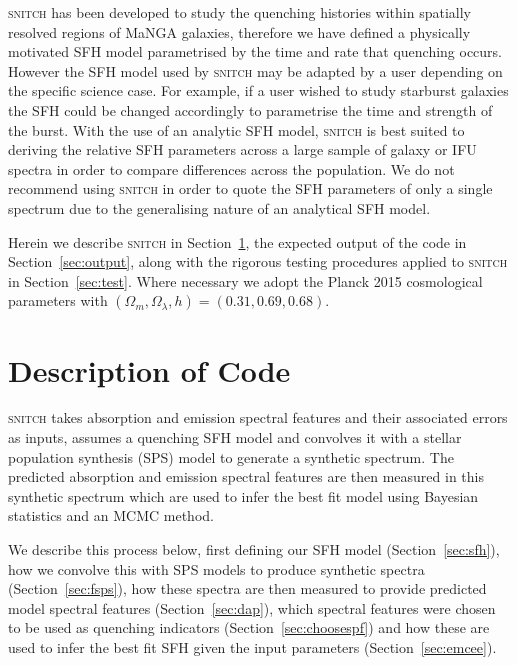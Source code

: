 \documentclass[useAMS,usenatbib]{mn2e}
\begin{document}
\textsc{snitch} has been developed to study the quenching histories within spatially resolved regions of MaNGA galaxies, therefore we have defined a physically motivated SFH model parametrised by the time and rate that quenching occurs. However the SFH model used by \textsc{snitch} may be adapted by a user depending on the specific science case. For example, if a user wished to study starburst galaxies the SFH could be changed accordingly to parametrise the time and strength of the burst. With the use of an analytic SFH model, \textsc{snitch} is best suited to deriving the relative SFH parameters across a large sample of galaxy or IFU spectra in order to compare differences across the population. We do not recommend using \textsc{snitch} in order to quote the SFH parameters of only a single spectrum due to the generalising nature of an analytical SFH model.  



Herein we describe \textsc{snitch} in Section~\ref{sec:code}, the expected output of the code in Section~\ref{sec:output}, along with the rigorous testing procedures applied to \textsc{snitch} in Section~\ref{sec:test}. Where necessary we adopt the Planck 2015 \citep{planck16} cosmological parameters with $(\Omega_m, \Omega_{\lambda}, h) = (0.31, 0.69, 0.68)$. 

\section{Description of Code}\label{sec:code}

\textsc{snitch} takes absorption and emission spectral features and their associated errors as inputs, assumes a quenching SFH model and convolves it with a stellar population synthesis (SPS) model to generate a synthetic spectrum. The predicted absorption and emission spectral features are then measured in this synthetic spectrum which are used to infer the best fit model using Bayesian statistics and an MCMC method. 

We describe this process below, first defining our SFH model (Section~\ref{sec:sfh}), how we convolve this with SPS models to produce synthetic spectra (Section~\ref{sec:fsps}), how these spectra are then measured to provide predicted model spectral features (Section~\ref{sec:dap}), which spectral features were chosen to be used as quenching indicators (Section~\ref{sec:choosespf}) and how these are used to infer the best fit SFH given the input parameters (Section~\ref{sec:emcee}). 
\end{document}
